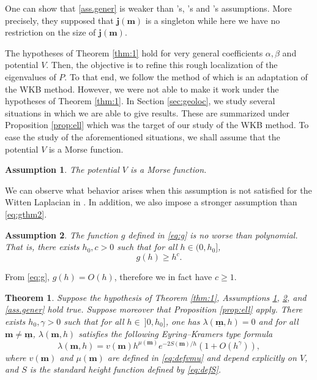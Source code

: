 \documentclass[12pt]{amsart}
\numberwithin{equation}{section}
\numberwithin{figure}{section}
\def\m{\mathbf{m}}
\def\j{\mathbf{j}}
\def\um{\underline{\m}}
\newtheorem{theorem}{Theorem}
\newtheorem{assumption}{Assumption}
\begin{document}
One can show that \eqref{ass.gener} is weaker than \cite{BoGaKl05_01}'s, \cite{HeKlNi04_01}'s and \cite{HeHiSj11_01}'s assumptions. More precisely, they supposed that $\j(\m)$ is a singleton while here we have no restriction on the size of $\j(\m)$.





The hypotheses of Theorem \ref{thm:1} hold for very general coefficients $\alpha,\beta$ and potential $V$. Then, the objective is to refine this rough localization of the eigenvalues of $P$. To that end, we follow the method of \cite[Section 3]{BoLePMi22} which is an adaptation of the WKB method. However, we were not able to make it work under the hypotheses of Theorem \ref{thm:1}. In Section \ref{sec:geoloc}, we study several situations in which we are able to give results. These are summarized under Proposition \ref{prop:ell} which was the target of our study of the WKB method. To ease the study of the aforementioned situations, we shall assume that the potential $V$ is a Morse function.
\begin{assumption}\label{ass:vraimentMorse}
    The potential $V$ is a Morse function.
\end{assumption}
We can observe what behavior arises when this assumption is not satisfied for the Witten Laplacian in \cite{De25_1}. In addition, we also impose a stronger assumption than \eqref{eq:gthm2}.
\begin{assumption}\label{ass.polyg}
    The function $g$ defined in \eqref{eq:g} is no worse than polynomial. That is, there exists $h_0,c>0$ such that for all $h\in(0,h_0]$,
    \begin{equation*}
    g(h)\geq h^c.
    \end{equation*}
\end{assumption}
From \eqref{eq:g}, $g(h) = O(h)$, therefore we in fact have $c\geq1$.

\begin{theorem}\label{thm:2}
    Suppose the hypothesis of Theorem \ref{thm:1}, Assumptions \ref{ass:vraimentMorse}, \ref{ass.polyg}, and \eqref{ass.gener} hold true. Suppose moreover that Proposition \ref{prop:ell} apply. There exists $h_0,\gamma > 0$ such that for all $h\in\ ]0,h_0]$, one has $\lambda(\um,h) = 0$ and for all $\m\neq\um$, $\lambda(\m,h)$ satisfies the following Eyring–Kramers type formula
    \begin{equation*}
    \lambda(\m,h) = v(\m)h^{\mu(\m)}e^{-2S(\m)/h}(1+O(h^\gamma)),
    \end{equation*}
    where $v(\m)$ and $\mu(\m)$ are defined in \eqref{eq:defvmu} and depend explicitly on $V$, and $S$ is the standard height function defined by \eqref{eq:defS}.
\end{theorem}
\end{document}
